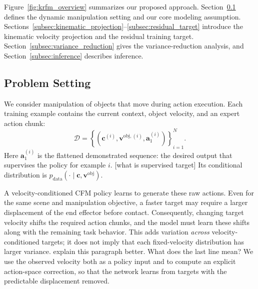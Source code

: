 \documentclass[10pt,twocolumn,letterpaper]{article}
\newcommand{\EditAP}[1]{{\color{blue} #1}}
\begin{document}
Figure~\ref{fig:krfm_overview} summarizes our proposed approach. Section~\ref{subsec:problem_setting} defines the
dynamic manipulation setting and our core modeling assumption.
Sections~\ref{subsec:kinematic_projection}--\ref{subsec:residual_target}
introduce the kinematic velocity projection and the residual training target.
Section~\ref{subsec:variance_reduction} gives the variance-reduction analysis,
and Section~\ref{subsec:inference} describes inference.

\subsection{Problem Setting}
\label{subsec:problem_setting}

We consider manipulation of objects that move during action execution.
Each training example contains the current context, object velocity,
and an expert action chunk:
\[
    \mathcal D=\left\{
    (\mathbf c^{(i)},\mathbf v^{\mathrm{obj},(i)},\mathbf a_1^{(i)})
    \right\}_{i=1}^N.
\]
Here $\mathbf a_1^{(i)}$ is the flattened demonstrated sequence: the desired
output that supervises the policy for example $i$. \EditAP{[what is supervised target]}
Its conditional distribution is
$p_{\mathrm{data}}(\cdot\mid\mathbf c,\mathbf v^{\mathrm{obj}})$.

A velocity-conditioned CFM policy learns to generate these raw actions.
Even for the same scene and manipulation objective, a faster target may
require a larger displacement of the end effector before contact.
Consequently, changing target velocity shifts the required action chunks,
and the model must learn these shifts along with the remaining task
behavior. This adds variation \emph{across} velocity-conditioned targets;
it does not imply that each fixed-velocity distribution has larger variance.
\EditAP{explain this paragraph better. What does the last line mean?}
We use the observed velocity both as a policy input and to compute an
explicit action-space correction, so that the network learns from targets
with the predictable displacement removed.
\end{document}
